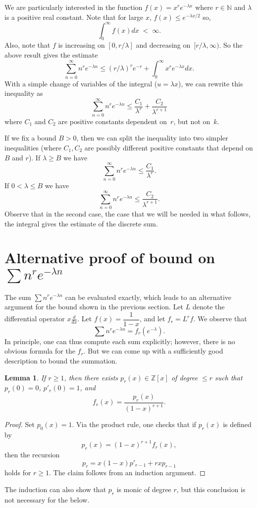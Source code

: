 \documentclass {amsart}
\theoremstyle{plain}
\newtheorem{lemma}[proposition]{Lemma}
\theoremstyle{definition}
\theoremstyle{remark}
\newcommand{\bN}{{\mathbb{N}}}
\newcommand{\Z}{{\mathbb{Z}}}
\begin{document}
We are particularly interested in the function $f(x) = x^r e^{-\lambda x}$ where $r \in \bN$
and $\lambda$ is a positive real constant. Note that for large $x$, $f(x) \le e^{-\lambda x / 2}$
so, 
$$
\int_{0}^\infty f(x) dx \; < \; \infty.
$$
Also, note that $f$ is increasing on $[0, r/\lambda]$ and decreasing on~$[r/\lambda, \infty)$.
So the above result gives the estimate
$$
\sum_{n=0}^\infty n^r e^{-\lambda n} \le (r/\lambda)^r e^{-r} + \int_{0}^\infty  x^r e^{-\lambda x} dx.
$$
With a simple change of variables of the integral ($u = \lambda x$), we can rewrite this
inequality as
$$
\sum_{n=0}^\infty n^r e^{-\lambda n} \le \frac{C_1}{\lambda^r} + \frac{C_2}{\lambda^{r+1}}
$$
where $C_1$ and $C_2$ are positive constants dependent on~$r$, but not on~$k$.

If we fix a bound $B >0$, then we can split the inequality into two simpler inequalities
(where $C_1, C_2$ are possibly different positive constants that depend on $B$ and $r$).
If $\lambda \ge B$ we have
$$
\sum_{n=0}^\infty n^r e^{-\lambda n} \le \frac{C_1}{\lambda^r} .
$$
If $0 < \lambda \le B$ we have
$$
\sum_{n=0}^\infty n^r e^{-\lambda n} \le \frac{C_2}{\lambda^{r+1}}.
$$
Observe that in the second case, the case that we will be needed in what follows,
the integral gives the estimate of the discrete sum.


\section{Alternative proof of bound on $\sum n^r e^{-\lambda n}$}
\label{sec:altern-proof-bound}

The sum $\sum n^r e^{-\lambda n}$ can be evaluated exactly, which leads to an alternative argument for the bound shown in the previous section. Let $L$ denote the differential operator $x \frac{d}{dx}$. Let $f(x) = \dfrac{1}{1-x}$, and let $f_r = L^r f$. We observe that
\[
\sum n^r e^{-\lambda n} = f_r(e^{-\lambda}).
\]
In principle, one can thus compute each sum explicitly; however, there is no obvious formula for the $f_r$. But we can come up with a sufficiently good description to bound the summation.
\begin{lemma}
  If $r \geq 1$, then there exists $p_r(x) \in \Z[x]$ of degree $\leq r$ such that $p_r(0) = 0$, $p'_r(0) = 1$, and
  \[
  f_r(x) = \frac{p_r(x)}{(1-x)^{r+1}}.
  \]
\end{lemma}

\begin{proof}
  Set $p_0(x) = 1$. Via the product rule, one checks that if $p_r(x)$ is defined by 
  \[
  p_r(x) = (1-x)^{r+1} f_r(x),
  \]
  then the recursion
  \[
  p_r = x(1-x)p'_{r-1} + rxp_{r-1}
  \]
  holds for $r \geq 1$. The claim follows from an induction argument.
\end{proof}
The induction can also show that $p_r$ is monic of degree $r$, but this conclusion is not necessary for the below.
\end{document}
